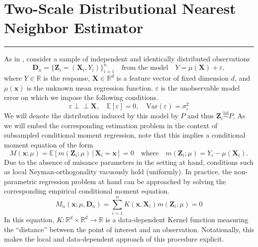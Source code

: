 \documentclass[letterpaper,10pt]{article}
\numberwithin{equation}{section}
\numberwithin{thm}{section}
\numberwithin{lem}{section}
\numberwithin{cor}{section}
\newcommand{\E}{\mathbb{E}}
\newcommand{\1}{\mathbbm{1}}
\newcommand{\Var}{\text{Var}}
\newcommand{\indep}{\perp\!\!\!\!\perp}
\begin{document}
\section{Two-Scale Distributional Nearest Neighbor Estimator}\label{TDNN}
\hrule
As in \citet{demirkaya_optimal_2024}, consider a sample of independent and identically distributed observations
\begin{equation}\label{DGP}
	\mathbf{D}_n = \{\mathbf{Z}_i = (\mathbf{X}_i, Y_i)\}_{i = 1}^{n}
	\quad \text{from the model} \quad
	Y = \mu(\mathbf{X}) + \varepsilon,
\end{equation}
where $Y \in \mathbb{R}$ is the response, $\mathbf{X} \in \mathbb{R}^d$ is a feature vector of fixed dimension $d$, and $\mu(\mathbf{x})$ is the unknown mean regression function.
$\varepsilon$ is the unobservable model error on which we impose the following conditions.
\begin{equation}
	\varepsilon \indep \mathbf{X}, \quad
	\E\left[\varepsilon\right] = 0, \quad
	\Var\left(\varepsilon\right) = \sigma_{\varepsilon}^2
\end{equation}
We will denote the distribution induced by this model by $P$ and thus $\mathbf{Z}_i \overset{\text{iid}}{\sim} P$.
As we will embed the corresponding estimation problem in the context of subsampled conditional moment regression, note that this implies a conditional moment equation of the form
\begin{equation}\label{CondMomEq}
	M(\mathbf{x}; \mu)
	= \E\left[m(\mathbf{Z}_i; \mu) \, | \, \mathbf{X}_i = \mathbf{x}\right]
	= 0
	\quad \text{where} \quad
	m(\mathbf{Z}_i; \mu) = Y_i - \mu(\mathbf{X}_i).
\end{equation}
Due to the absence of nuisance parameters in the setting at hand, conditions such as local Neyman-orthogonality vacuously hold (uniformly).
In practice, the non-parametric regression problem at hand can be approached by solving the corresponding empirical conditional moment equation.
\begin{equation}\label{EmpCondMomEq}
	M_n(\mathbf{x}; \mu, \mathbf{D}_n)
	= \sum_{i = 1}^{n}K(\mathbf{x}, \mathbf{X}_i)m(\mathbf{Z}_i; \mu)
	= 0
\end{equation}
In this equation, $K:\mathbb{R}^d \times \mathbb{R}^d \rightarrow \mathbb{R}$ is a data-dependent Kernel function measuring the ``distance'' between the point of interest and an observation.
Notationally, this makes the local and data-dependent approach of this procedure explicit.
\end{document}

